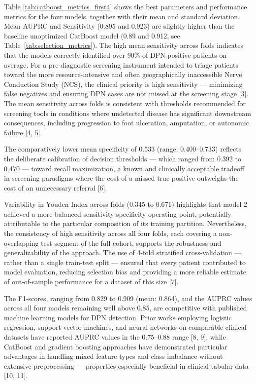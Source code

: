 \documentclass[pdflatex,sn-vancouver-num]{sn-jnl}
\begin{document}
Table \ref{tab:catboost_metrics_first4} shows the best parameters and performance metrics for the four models, together with their mean and standard deviation. Mean AUPRC and Sensitivity (0.895 and 0.923) are slightly higher than the baseline unoptimized CatBoost model (0.89 and 0.912, see Table~\ref{tab:selection_metrics}). The high mean sensitivity across folds indicates that the models correctly identified over 90\% of DPN-positive patients on average. For a pre-diagnostic screening instrument intended to triage patients toward the more resource-intensive and often geographically inaccessible Nerve Conduction Study (NCS), the clinical priority is high sensitivity — minimizing false negatives and ensuring DPN cases are not missed at the screening stage [3]. 
The mean sensitivity across folds is consistent with thresholds recommended for screening tools in conditions where undetected disease has significant downstream consequences, including progression to foot ulceration, amputation, or autonomic failure [4, 5].  

The comparatively lower mean specificity of 0.533 (range: 0.400–0.733) reflects the deliberate calibration of decision thresholds — which ranged from 0.392 to 0.470 — toward recall maximization, a known and clinically acceptable tradeoff in screening paradigms where the cost of a missed true positive outweighs the cost of an unnecessary referral [6].

Variability in Youden Index across folds (0.345 to 0.671) highlights that model 2 achieved a more balanced sensitivity-specificity operating point, potentially attributable to the particular composition of its training partition. Nevertheless, the consistency of high sensitivity across all four folds, each covering a non-overlapping test segment of the full cohort, supports the robustness and generalizability of the approach. The use of 4-fold stratified cross-validation — rather than a single train-test split — ensured that every patient contributed to model evaluation, reducing selection bias and providing a more reliable estimate of out-of-sample performance for a dataset of this size [7].

The F1-scores, ranging from 0.829 to 0.909 (mean: 0.864), and the AUPRC values across all four models remaining well above 0.85, are competitive with published machine learning models for DPN detection. Prior works employing logistic regression, support vector machines, and neural networks on comparable clinical datasets have reported AUPRC values in the 0.75–0.88 range [8, 9], while CatBoost and gradient boosting approaches have demonstrated particular advantages in handling mixed feature types and class imbalance without extensive preprocessing — properties especially beneficial in clinical tabular data [10, 11].
\end{document}
